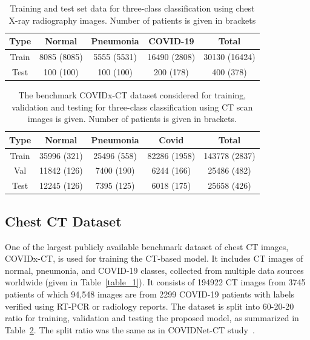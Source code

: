 \documentclass[10pt,journal,compsoc]{IEEEtran}
\begin{document}
\begin{table}
\renewcommand{\arraystretch}{1.3}
\caption{Training and test set data for three-class classification using chest X-ray radiography images. Number of patients is given in brackets}
\label{table_3}
\centering
\begin{tabular}{|c|c|c|c|c|}
\hline
Type & Normal & Pneumonia & COVID-19 & Total\\
\hline
Train & 8085 (8085) & 5555 (5531) & 16490 (2808) & 30130 (16424) \\
\hline
Test & 100 (100) & 100 (100) & 200 (178) & 400 (378) \\
\hline
\end{tabular}
\end{table}

\begin{table}
\renewcommand{\arraystretch}{1.3}
\caption{The benchmark COVIDx-CT dataset considered for training, validation and testing for three-class classification using CT scan images is given. Number of patients is given in brackets.}
\label{table_4}
\centering
\begin{tabular}{|c|c|c|c|c|}
\hline
\bfseries Type &  \bfseries Normal & \bfseries Pneumonia & \bfseries Covid & \bfseries Total\\
\hline
    Train   & 35996  (321)  & 25496  (558)    & 82286  (1958)  & 143778  (2837)   \\
\hline
    Val     & 11842 (126)  & 7400 (190)     & 6244 (166)    & 25486 (482)      \\
\hline
    Test    & 12245 (126)  & 7395 (125)     & 6018 (175)    & 25658 (426)     \\
\hline
\end{tabular}
\end{table}

\subsection{Chest CT Dataset}
One of the largest publicly available benchmark dataset of chest CT images, COVIDx-CT, is used for training the CT-based model. It includes CT images of normal, pneumonia, and COVID-19 classes, collected from multiple data sources worldwide (given in Table~\ref{table_1}). It consists of 194922 CT images from 3745 patients of which 94,548 images are from 2299 COVID-19 patients with labels verified using RT-PCR or radiology reports. The dataset is split into 60-20-20 ratio for training, validation and testing the proposed model, as summarized in Table~\ref{table_4}. The split ratio was the same as in COVIDNet-CT study~\cite{gunraj2020covidnet}.
\end{document}
